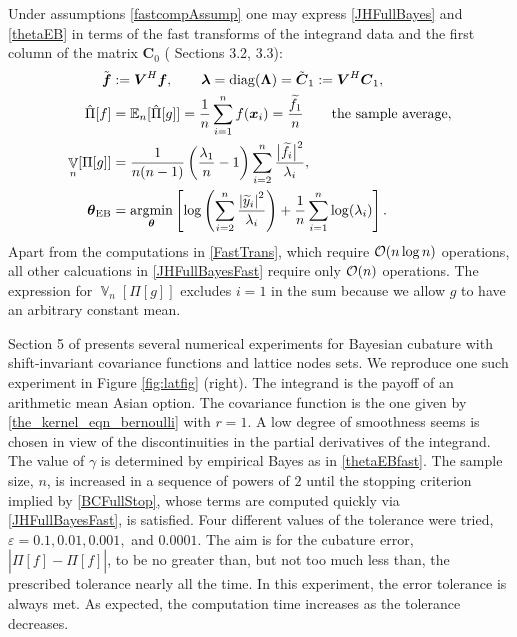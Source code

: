 \documentclass[sts]{imsart}
\numberwithin{equation}{section}
\theoremstyle{plain}
\newcommand{\vC}{\boldsymbol{C}}
\DeclareMathOperator{\Var}{\mathbb{V}}
\newcommand{\JH}{\citetalias{RatHic19a}}%
\newcommand{\vLambda}{\boldsymbol{\Lambda}}
\begin{document}
Under assumptions \eqref{fastcompAssump} one may express \eqref{JHFullBayes} and \eqref{thetaEB} in terms of the fast transforms of the integrand data and the first column of the matrix $\vC_0$ (\JH{} Sections 3.2, 3.3):
\begin{subequations} \label{JHFullBayesFast}
\begin{align}
\label{FastTrans}
\tvf & : = \vV^{H} \vf, \qquad \vlambda = \diag(\vLambda) = \tilde{\vC}_1 := \vV^{H} \vC_1, \\
    \hat{\Pi}[f] & =  \Ex_n[\hat{\Pi}[g]] = \frac 1n \sum_{i=1}^n f(\vx_i) = \frac{\tf_1}{n} \qquad \text{the sample average},\\
\Var_n[\Pi[g]] & = \frac{1}{n(n-1)} \left(\frac{\lambda_1}{n}  - 1  \right)\sum_{i=2}^n \frac{\bigl \lvert \tf_i\bigr \rvert^2}{\lambda_i} , \\
\label{thetaEBfast}
\vtheta_{\textup{EB}} &= 
\argmin_{\vtheta}
\left[
\log\left(
\sum_{i=2}^n \frac{\abs{\widetilde{y}_i}^2}{\lambda_i}
\right)  
  + 
\frac{1}{n}\sum_{i=1}^n \log(\lambda_i)
\right].
\end{align}
\end{subequations}
Apart from the computations in \eqref{FastTrans}, which require $\operatorname{{\mathcal O}}(n \log n)$ operations, all other calcuations in \eqref{JHFullBayesFast} require only $\operatorname{{\mathcal O}}(n)$ operations.  The expression for $\Var_n[\Pi[g]]$ excludes $i=1$ in the sum because we allow $g$ to have an arbitrary constant mean.

Section 5 of \JH{} presents several numerical experiments for Bayesian cubature with shift-invariant covariance functions and lattice nodes sets.  We reproduce one such experiment in Figure \ref{fig:latfig} (right).  The integrand is the payoff of an arithmetic mean Asian option.  The covariance function is the one given by \eqref{the_kernel_eqn_bernoulli} with $r=1$.  A low degree of smoothness seems is chosen in view of the discontinuities in the partial derivatives of the integrand.  The value of $\gamma$ is determined by empirical Bayes as in \eqref{thetaEBfast}.  The sample size, $n$, is increased in a sequence of powers of $2$ until the stopping criterion implied by \eqref{BCFullStop}, whose terms are computed quickly via \eqref{JHFullBayesFast}, is satisfied.  Four different values of the tolerance were tried, $\varepsilon = 0.1, 0.01, 0.001,$ and $0.0001$. The aim is for the cubature error, $|\Pi[f] - \hat{\Pi}[f]|$, to be no greater than, but not too much less than, the prescribed tolerance nearly all the time.  In this experiment, the error tolerance is always met.  As expected, the computation time increases as the tolerance decreases.  
\end{document}
